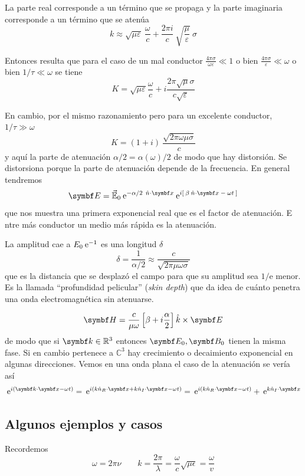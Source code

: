 \documentclass[10pt,oneside]{CBFT_book}
\begin{document}
La parte real corresponde a un término que se propaga y la parte imaginaria 
corresponde a un término que se atenúa
\[
	k \approx  \sqrt{ \mu \varepsilon } \: \frac{\omega}{c} + 
	 \frac{2 \pi i}{c} \: \sqrt{ \frac{ \mu }{ \varepsilon } } \: \sigma
\]

Entonces resulta que para el caso de un mal conductor 
$ \frac{4\pi\sigma}{\omega \varepsilon} \ll 1 $ o bien 
$ \frac{4\pi\sigma}{\varepsilon} \ll \omega $ o bien $ 1/\tau \ll \omega $ se tiene 
\[
	K = \sqrt{ \mu \varepsilon }\frac{\omega}{c} +
	i \frac{2\pi\sqrt{\mu}\sigma}{c\sqrt{\varepsilon}}
\]

En cambio, por el mismo razonamiento pero para un excelente conductor, $1/\tau \gg \omega$
\[
	K = ( 1 + i ) \: \frac{ \sqrt{2\pi\omega\mu\sigma} }{ c }
\]
y aquí la parte de atenuación $\alpha/2 = \alpha(\omega)/2$ de modo que hay distorsión.
Se distorsiona porque la parte de atenuación depende de la frecuencia.
En general tendremos
\[
	\vb{E} = \vec{ \mathbb{E} }_0 \euler^{ -\alpha/2 \: \nver\cdot\vb{x} } 
	\euler^{ i [ \: \beta \: \hat{n}\cdot\vb{x} \: - \: \omega t \: ] }
\]
que nos muestra una primera exponencial real que es el factor de atenuación. E
ntre más conductor un medio más rápida es la atenuación.

La amplitud cae a $E_0 \:\mathrm{e}^{-1}$ es una longitud $\delta$
\[
	\delta = \frac{1}{\alpha/2} \approx \frac{ c }{ \sqrt{ 2 \pi \mu \omega \sigma } }
\]
que es la distancia que se desplazó el campo para que su amplitud sea $1/\mathrm{e}$ menor.
Es la llamada ``profundidad pelicular'' ({\it skin depth}) que da idea de cuánto penetra una onda
electromagnética sin atenuarse.

\[
	\vb{H} = \frac{c}{\mu\omega}\left[ \beta + i \frac{\alpha}{2} \right] \hat{k}\times \vb{E}
\]
de modo que si $\vb{k} \in \mathbb{R}^3$ entonces $\vb{E}_0, \vb{B}_0$ tienen la misma fase. Si en cambio 
 pertenece a $\mathbb{C}^3$ hay crecimiento o decaimiento exponencial en algunas direcciones.
Vemos en una onda plana el caso de la atenuación se vería así
\[
	\euler^{i(\vb{k}\cdot\vb{x}-\omega t)} =
	\euler^{i( k\hat{n}_R \cdot\vb{x} + k\hat{n}_I \cdot\vb{x} -\omega t)} =
	\euler^{i( k\hat{n}_R \cdot\vb{x} -\omega t) } + \euler^{ k\hat{n}_I \cdot\vb{x} }
\]

\subsection{Algunos ejemplos y casos}

Recordemos 
\[
	\omega = 2\pi\nu  \qquad k=\frac{2\pi}{\lambda}=\frac{\omega}{c}\sqrt{\mu\epsilon} =\frac{\omega}{v}
\]
\end{document}
